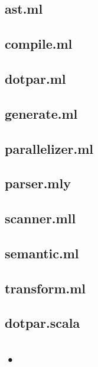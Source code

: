 \documentclass[11pt]{article}
\begin{document}
\subsection{ast.ml}


\subsection{compile.ml}


\subsection{dotpar.ml}


\subsection{generate.ml}


\subsection{parallelizer.ml}


\subsection{parser.mly}


\subsection{scanner.mll}


\subsection{semantic.ml}


\subsection{transform.ml}


\subsection{dotpar.scala}


\subsection{•}
\end{document}
